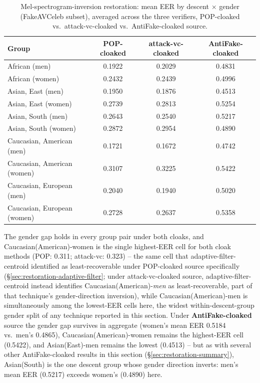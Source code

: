 \documentclass[11pt]{article}
\begin{document}
\begin{table}[H]
\centering
\caption{Mel-spectrogram-inversion restoration: mean EER by descent
$\times$ gender (FakeAVCeleb subset), averaged across the three
verifiers, POP-cloaked vs.\ attack-vc-cloaked vs.\ AntiFake-cloaked
source.}
\label{tab:restoration-mel-demographics}
\begin{tabular}{lccc}
\toprule
Group & POP-cloaked & attack-vc-cloaked & AntiFake-cloaked \\
\midrule
African (men)               & 0.1922 & 0.2029 & 0.4831 \\
African (women)              & 0.2432 & 0.2439 & 0.4996 \\
Asian, East (men)            & 0.1950 & 0.1876 & 0.4513 \\
Asian, East (women)          & 0.2739 & 0.2813 & 0.5254 \\
Asian, South (men)           & 0.2643 & 0.2540 & 0.5217 \\
Asian, South (women)         & 0.2872 & 0.2954 & 0.4890 \\
Caucasian, American (men)    & 0.1721 & 0.1672 & 0.4742 \\
Caucasian, American (women)  & 0.3107 & 0.3225 & 0.5422 \\
Caucasian, European (men)    & 0.2040 & 0.1940 & 0.5020 \\
Caucasian, European (women)  & 0.2728 & 0.2637 & 0.5358 \\
\bottomrule
\end{tabular}
\end{table}

The gender gap holds in every group pair under both cloaks, and
Caucasian(American)-women is the single highest-EER cell for both
cloak methods (POP: 0.311; attack-vc: 0.323) -- the same cell that
adaptive-filter-centroid identified as least-recoverable under
POP-cloaked source specifically
(\S\ref{sec:restoration-adaptive-filter}; under attack-vc-cloaked
source, adaptive-filter-centroid instead identifies
Caucasian(American)-\emph{men} as least-recoverable, part of that
technique's gender-direction inversion), while
Caucasian(American)-men is simultaneously among the lowest-EER cells
here,
the widest within-descent-group gender split of any technique reported
in this section. Under \textbf{AntiFake-cloaked} source the gender gap
survives in aggregate (women's mean EER 0.5184 vs.\ men's 0.4865),
Caucasian(American)-women remains the highest-EER cell (0.5422), and
Asian(East)-men remains the lowest (0.4513) -- but as with several other
AntiFake-cloaked results in this section (\S\ref{sec:restoration-summary}),
Asian(South) is the one descent group whose gender direction inverts:
men's mean EER (0.5217) exceeds women's (0.4890) here.
\end{document}
